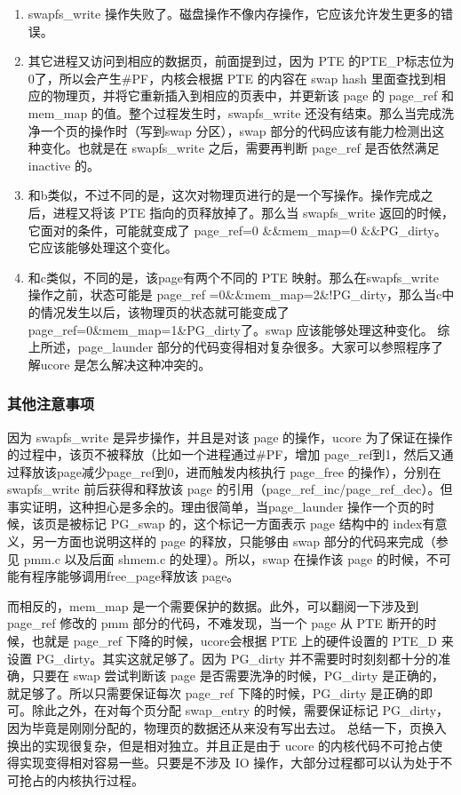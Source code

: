 \begin{enumerate}
\def\labelenumi{\alph{enumi}.}
\item
  swapfs\_write
  操作失败了。磁盘操作不像内存操作，它应该允许发生更多的错误。
\item
  其它进程又访问到相应的数据页，前面提到过，因为 PTE
  的PTE\_P标志位为0了，所以会产生\#PF，内核会根据 PTE 的内容在 swap hash
  里面查找到相应的物理页，并将它重新插入到相应的页表中，并更新该 page 的
  page\_ref 和 mem\_map 的值。整个过程发生时，swapfs\_write
  还没有结束。那么当完成洗净一个页的操作时（写到swap 分区），swap
  部分的代码应该有能力检测出这种变化。也就是在 swapfs\_write
  之后，需要再判断 page\_ref 是否依然满足 inactive 的。
\item
  和b类似，不过不同的是，这次对物理页进行的是一个写操作。操作完成之后，进程又将该
  PTE 指向的页释放掉了。那么当 swapfs\_write
  返回的时候，它面对的条件，可能就变成了 page\_ref=0 \&\&mem\_map=0
  \&\&PG\_dirty。它应该能够处理这个变化。
\item
  和c类似，不同的是，该page有两个不同的 PTE 映射。那么在swapfs\_write
  操作之前，状态可能是 page\_ref
  =0\&\&mem\_map=2\&!PG\_dirty，那么当c中的情况发生以后，该物理页的状态就可能变成了
  page\_ref=0\&mem\_map=1\&PG\_dirty了。swap 应该能够处理这种变化。
  综上所述，page\_launder
  部分的代码变得相对复杂很多。大家可以参照程序了解ucore
  是怎么解决这种冲突的。
\end{enumerate}

\subsubsection{其他注意事项}\label{ux5176ux4ed6ux6ce8ux610fux4e8bux9879}

因为 swapfs\_write 是异步操作，并且是对该 page 的操作，ucore
为了保证在操作的过程中，该页不被释放（比如一个进程通过\#PF，增加
page\_ref到1，然后又通过释放该page减少page\_ref到0，进而触发内核执行
page\_free 的操作），分别在 swapfs\_write 前后获得和释放该 page
的引用（page\_ref\_inc/page\_ref\_dec）。但事实证明，这种担心是多余的。理由很简单，当page\_launder
操作一个页的时候，该页是被标记 PG\_swap 的，这个标记一方面表示 page
结构中的 index有意义，另一方面也说明这样的 page 的释放，只能够由 swap
部分的代码来完成（参见 pmm.c 以及后面 shmem.c 的处理）。所以，swap
在操作该 page 的时候，不可能有程序能够调用free\_page释放该 page。

而相反的，mem\_map 是一个需要保护的数据。此外，可以翻阅一下涉及到
page\_ref 修改的 pmm 部分的代码，不难发现，当一个 page 从 PTE
断开的时候，也就是 page\_ref 下降的时候，ucore会根据 PTE 上的硬件设置的
PTE\_D 来设置 PG\_dirty。其实这就足够了。因为 PG\_dirty
并不需要时时刻刻都十分的准确，只要在 swap 尝试判断该 page
是否需要洗净的时候，PG\_dirty 是正确的，就足够了。所以只需要保证每次
page\_ref 下降的时候，PG\_dirty 是正确的即可。除此之外，在对每个页分配
swap\_entry 的时候，需要保证标记
PG\_dirty，因为毕竟是刚刚分配的，物理页的数据还从来没有写出去过。
总结一下，页换入换出的实现很复杂，但是相对独立。并且正是由于 ucore
的内核代码不可抢占使得实现变得相对容易一些。只要是不涉及 IO
操作，大部分过程都可以认为处于不可抢占的内核执行过程。
